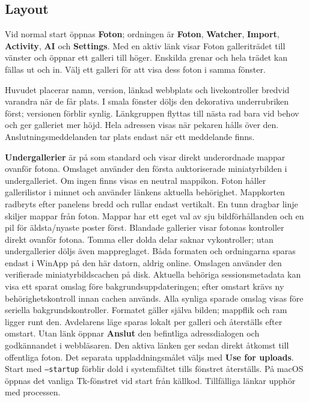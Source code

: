 \documentclass[11pt,a4paper]{article}
\newcommand{\ui}[1]{\textbf{#1}}
\begin{document}
\subsection{Layout}

Vid normal start öppnas \ui{Foton}; ordningen är \ui{Foton}, \ui{Watcher},
\ui{Import}, \ui{Activity}, \ui{AI} och \ui{Settings}. Med en aktiv
länk visar Foton galleriträdet till vänster och öppnar ett galleri till höger.
Enskilda grenar och hela trädet kan fällas ut och in. Välj ett galleri för
att visa dess foton i samma fönster.

Huvudet placerar namn, version, länkad webbplats och livekontroller bredvid
varandra när de får plats. I smala fönster döljs den dekorativa underrubriken
först; versionen förblir synlig. Länkgruppen flyttas till nästa rad bara vid
behov och ger galleriet mer höjd. Hela adressen visas när pekaren hålls över den.
Anslutningsmeddelanden tar plats endast när ett meddelande finns.

\ui{Undergallerier} är på som standard
och visar direkt underordnade mappar ovanför fotona. Omslaget använder den
första auktoriserade miniatyrbilden i undergalleriet. Om ingen finns visas en
neutral mappikon. Foton håller gallerilistor i minnet och använder länkens
aktuella behörighet.
Mappkorten radbryts efter panelens bredd och rullar endast vertikalt. En tunn
dragbar linje skiljer mappar från foton. Mappar har ett eget val av sju bildförhållanden
och en pil för äldsta/nyaste poster först. Blandade gallerier visar fotonas
kontroller direkt ovanför fotona. Tomma eller dolda delar saknar vykontroller;
utan undergallerier döljs även mappreglaget. Båda formaten och ordningarna
sparas endast i WinApp på den här datorn, aldrig online. Omslagen använder den
verifierade miniatyrbildscachen på disk. Aktuella behöriga sessionsmetadata
kan visa ett sparat omslag före bakgrundsuppdateringen; efter omstart krävs
ny behörighetskontroll innan cachen används.
Alla synliga sparade omslag visas före seriella bakgrundskontroller. Formatet
gäller själva bilden; mappflik och ram ligger runt den. Avdelarens läge sparas
lokalt per galleri och återställs efter omstart.
Utan länk öppnar \ui{Anslut} den
befintliga adressdialogen och godkännandet i webbläsaren. Den aktiva länken
ger sedan direkt åtkomst till offentliga foton. Det separata uppladdningsmålet
väljs med \ui{Use for uploads}. Start med \texttt{--startup} förblir dold i
systemfältet tills fönstret återställs. På macOS öppnas det vanliga Tk-fönstret
vid start från källkod. Tillfälliga länkar upphör med processen.
\end{document}
